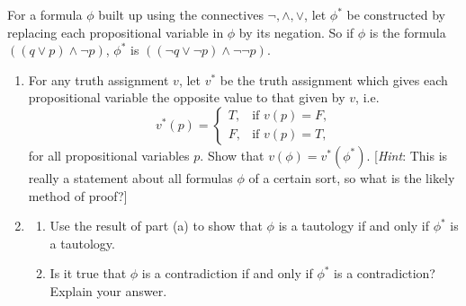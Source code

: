 \documentclass{article}
\theoremstyle{remark}\newtheorem{remark}{Remark}
\begin{document}
 For a formula $\phi$ built up using the connectives $\neg, \wedge, \vee$, let $\phi^*$ be constructed by replacing each propositional variable in $\phi$ by its negation. So if $\phi$ is the formula $((q \vee p) \wedge \neg p)$, $\phi^*$ is $((\neg q \vee \neg p) \wedge \neg\neg p)$.

\begin{enumerate}
    \item[(a)] For any truth assignment $v$, let $v^*$ be the truth assignment which gives each propositional variable the opposite value to that given by $v$, i.e.
    \[
        v^*(p) =
        \begin{cases}
            T, & \text{if } v(p) = F, \\
            F, & \text{if } v(p) = T,
        \end{cases}
    \]
    for all propositional variables $p$. Show that $v(\phi) = v^*(\phi^*)$. [\emph{Hint}: This is really a statement about all formulas $\phi$ of a certain sort, so what is the likely method of proof?]

    \item[(b)]
    \begin{enumerate}
        \item[(i)] Use the result of part (a) to show that $\phi$ is a tautology if and only if $\phi^*$ is a tautology.
        \item[(ii)] Is it true that $\phi$ is a contradiction if and only if $\phi^*$ is a contradiction? Explain your answer.
    \end{enumerate}
\end{enumerate}
\end{document}
